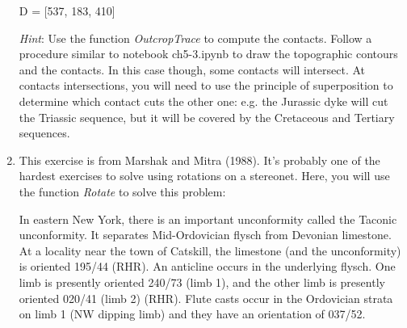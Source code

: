 \documentclass[a4paper , 12pt]{book}
\begin{document}
\begin{enumerate}
    D = [537, 183, 410]
    
    \textit{Hint}: Use the function \textit{OutcropTrace} to compute the contacts. Follow a procedure similar to notebook ch5-3.ipynb to draw the topographic contours and the contacts. In this case though, some contacts will intersect. At contacts intersections, you will need to use the principle of superposition to determine which contact cuts the other one: e.g. the Jurassic dyke will cut the Triassic sequence, but it will be covered by the Cretaceous and Tertiary sequences.
    
    \item This exercise is from Marshak and Mitra (1988). It's probably one of the hardest exercises to solve using rotations on a stereonet. Here, you will use the function \textit{Rotate} to solve this problem:
    
    In eastern New York, there is an important unconformity called the Taconic unconformity. It separates Mid-Ordovician flysch from Devonian limestone. At a locality near the town of Catskill, the limestone (and the unconformity) is oriented 195/44 (RHR). An anticline occurs in the underlying flysch. One limb is presently oriented 240/73 (limb 1), and the other limb is presently oriented 020/41 (limb 2) (RHR). Flute casts occur in the Ordovician strata on limb 1 (NW dipping limb) and they have an orientation of 037/52.
    

\end{enumerate}
\end{document}
